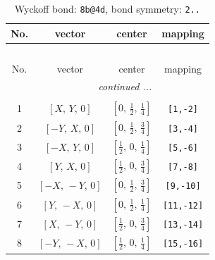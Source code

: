 \documentclass[fleqn,8pt]{jsarticle}
\begin{document}
\begin{longtable}{cccc}
\caption{Wyckoff bond: {\tt 8b@4d}, bond symmetry: {\tt 2..}}
 \\
 \hline \hline
No. & vector & center & mapping \\ \hline \endfirsthead

\multicolumn{3}{l}{\tablename\ \thetable{}} \\
 \hline \hline
No. & vector & center & mapping \\ \hline \endhead

 \hline \hline
\multicolumn{3}{r}{\footnotesize\it continued ...} \\ \endfoot

 \hline \hline
\multicolumn{3}{r}{} \\ \endlastfoot

1 & $\left[ X,\, Y,\, 0 \right]$ & $\left[ 0,\, \frac{1}{2},\, \frac{1}{4} \right]$ & {\tt [1,-2]} \\ \hline
2 & $\left[ - Y,\, X,\, 0 \right]$ & $\left[ 0,\, \frac{1}{2},\, \frac{3}{4} \right]$ & {\tt [3,-4]} \\ \hline
3 & $\left[ - X,\, Y,\, 0 \right]$ & $\left[ \frac{1}{2},\, 0,\, \frac{1}{4} \right]$ & {\tt [5,-6]} \\ \hline
4 & $\left[ Y,\, X,\, 0 \right]$ & $\left[ \frac{1}{2},\, 0,\, \frac{3}{4} \right]$ & {\tt [7,-8]} \\ \hline
5 & $\left[ - X,\, - Y,\, 0 \right]$ & $\left[ 0,\, \frac{1}{2},\, \frac{3}{4} \right]$ & {\tt [9,-10]} \\ \hline
6 & $\left[ Y,\, - X,\, 0 \right]$ & $\left[ 0,\, \frac{1}{2},\, \frac{1}{4} \right]$ & {\tt [11,-12]} \\ \hline
7 & $\left[ X,\, - Y,\, 0 \right]$ & $\left[ \frac{1}{2},\, 0,\, \frac{3}{4} \right]$ & {\tt [13,-14]} \\ \hline
8 & $\left[ - Y,\, - X,\, 0 \right]$ & $\left[ \frac{1}{2},\, 0,\, \frac{1}{4} \right]$ & {\tt [15,-16]} \\
\end{longtable}
\renewcommand{\arraystretch}{1.2}
\end{document}
